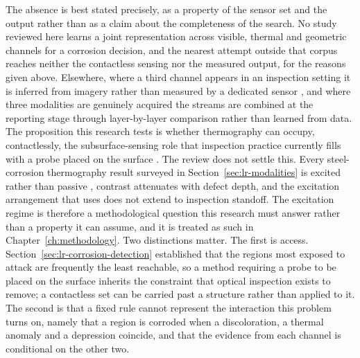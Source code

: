 The absence is best stated precisely, as a property of the sensor set and the
output rather than as a claim about the completeness of the search. No study
reviewed here learns a joint representation across visible, thermal and
geometric channels for a corrosion decision, and the nearest attempt outside
that corpus reaches neither the contactless sensing nor the measured output, for
the reasons given above. Elsewhere, where a third
channel appears in an inspection setting it is inferred from imagery rather than
measured by a dedicated sensor \citep{Cao2026,Nooralishahi2022}, and where three
modalities are genuinely acquired the streams are combined at the reporting
stage through layer-by-layer comparison \citep{Guedes2025} rather than learned
from data. The proposition this research tests is whether
thermography can occupy, contactlessly, the subsurface-sensing role that
inspection practice currently fills with a probe placed on the surface
\citep{Huang2026a,Yang2025}. The review does not settle this.
Every steel-corrosion thermography result surveyed in
Section~\ref{sec:lr-modalities} is excited rather than passive
\citep{Lim2021,Doshvarpassand2022,Elizalde2023}, contrast attenuates with
defect depth, and the excitation arrangement that \citet{Lim2021} uses does not
extend to inspection standoff. The excitation regime is therefore a
methodological question this research must answer rather than a property it can
assume, and it is treated as such in Chapter~\ref{ch:methodology}. Two distinctions matter. The first is access.
Section~\ref{sec:lr-corrosion-detection} established that the regions most
exposed to attack are frequently the least reachable, so a method requiring a
probe to be placed on the surface inherits the constraint that optical
inspection exists to remove; a contactless set can be carried past a structure
rather than applied to it. The second is that a fixed rule cannot represent the
interaction this problem turns on, namely that a region is
corroded when a discoloration, a thermal anomaly and a depression coincide, and
that the evidence from each channel is conditional on the other two.


